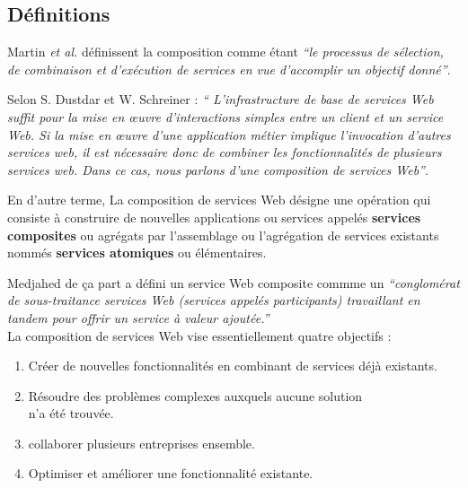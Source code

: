     \subsection{Définitions}
    \label{sec:definitions}

    Martin \emph{et al.} \cite{martin2004owl} définissent
    la composition comme étant \emph{``le processus de sélection, de
      combinaison et d'exécution de services en vue
      d'accomplir un objectif donné''}.

    Selon S. Dustdar et W. Schreiner \cite{dustdar2005survey} :
    \emph{`` L'infrastructure de base de services Web suffit pour la
      mise en œuvre d'interactions simples entre un client et un
      service Web. Si la mise en œuvre d'une application métier
      implique l'invocation d'autres services web, il est nécessaire
      donc de combiner les fonctionnalités de plusieurs services
      web. Dans ce cas, nous parlons d'une composition de services
      Web''}.

    En d'autre terme, La composition de services Web désigne une
    opération qui consiste à construire de nouvelles applications ou
    services appelés \textbf{services composites} ou agrégats par
    l'assemblage ou l'agrégation de services existants nommés
    \textbf{services atomiques} ou élémentaires.

    Medjahed \cite{medjahed2004thesis}de ça part a défini un service
    Web composite commme un \emph{``conglomérat de sous-traitance
      services Web (services appelés participants) travaillant en
      tandem pour offrir un service à valeur ajoutée.''}\\

    La composition de services Web vise essentiellement quatre
    objectifs \cite{driss2011approche}:
    \begin{enumerate}
      \item Créer de nouvelles fonctionnalités en combinant de services
        déjà existants.
      \item Résoudre des problèmes complexes auxquels aucune solution\\
        n'a été trouvée.
      \item collaborer plusieurs entreprises ensemble.
      \item Optimiser et améliorer une fonctionnalité existante.
    \end{enumerate}

